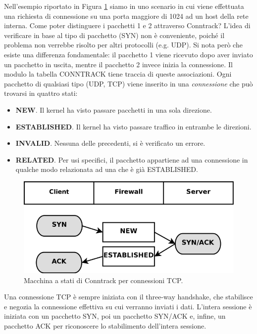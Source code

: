 \begin{enumerate}
\begin{figure}[htbp]
	\label{img:conntrack-example}
\end{figure}
\newpage
Nell'esempio riportato in Figura \ref{img:conntrack-example} siamo in uno scenario in cui viene effettuata una richiesta di connessione su una porta maggiore di 1024 ad un host della rete interna. Come poter distinguere i pacchetti 1 e 2 attraverso Conntrack? L'idea di verificare in base al tipo di pacchetto (SYN) non è conveniente, poiché il problema non verrebbe risolto per altri protocolli (e.g. UDP). Si nota però che esiste una differenza fondamentale: il pacchetto 1 viene ricevuto dopo aver inviato un pacchetto in uscita, mentre il pacchetto 2 invece inizia la connessione. Il modulo la tabella CONNTRACK tiene traccia di queste associazioni. Ogni pacchetto di qualsiasi tipo (UDP, TCP) viene inserito in una \textit{connessione} che può trovarsi in quattro stati:
\begin{itemize}
	\item \textbf{NEW}. Il kernel ha visto passare pacchetti in una sola direzione.
	\item \textbf{ESTABLISHED}. Il kernel ha visto passare traffico in entrambe le direzioni.
	\item \textbf{INVALID}. Nessuna delle precedenti, si è verificato un errore.
	\item \textbf{RELATED}. Per usi specifici, il pacchetto appartiene ad una connessione in qualche modo relazionata ad una che è già ESTABLISHED.
\end{itemize}
\begin{figure}[htbp]
	\centering
	\includegraphics[scale = 0.35]{images/conntrack-state-machine}
	\caption{Macchina a stati di Conntrack per connessioni TCP.}
	\label{img:conntrack-state-machine}
\end{figure}
Una connessione TCP è sempre iniziata con il three-way handshake, che stabilisce e negozia la connessione effettiva su cui verranno inviati i dati. L'intera sessione è iniziata con un pacchetto SYN, poi un pacchetto SYN/ACK e, infine, un pacchetto ACK per riconoscere lo stabilimento dell'intera sessione.\\

\end{enumerate}
